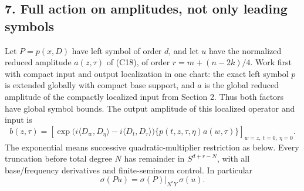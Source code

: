 \documentclass[
  11pt,
]{article}
\makeatletter
\let\ReaderOriginalAnchorStart\hyper@anchorstart
\let\ReaderOriginalAnchorEnd\hyper@anchorend
\let\ReaderPendingAliases\@empty
\def\ReaderArmAliases#1{\gdef\ReaderPendingAliases{#1}}
\def\hyper@anchorstart#1{\ReaderIfNativeAnchorTF{#1}{\ReaderPendingAliases\global\let\ReaderPendingAliases\@empty}{}\ReaderOriginalAnchorStart{#1}}
\makeatother
\begin{document}
\ReaderArmAliases{\ReaderOriginalAnchorStart{AN03-CN-007}\ReaderOriginalAnchorEnd\begingroup\expandafter\def\csname @currentHref\endcsname{AN03-CN-007}\label{AN03-CN-007}\endgroup\ReaderOriginalAnchorStart{an03-cn-007-full-action-on-amplitudes-not-only-leading-symbols}\ReaderOriginalAnchorEnd\begingroup\expandafter\def\csname @currentHref\endcsname{an03-cn-007-full-action-on-amplitudes-not-only-leading-symbols}\label{an03-cn-007-full-action-on-amplitudes-not-only-leading-symbols}\endgroup\ReaderOriginalAnchorStart{7-full-action-on-amplitudes-not-only-leading-symbols}\ReaderOriginalAnchorEnd\begingroup\expandafter\def\csname @currentHref\endcsname{7-full-action-on-amplitudes-not-only-leading-symbols}\label{7-full-action-on-amplitudes-not-only-leading-symbols}\endgroup\ReaderOriginalAnchorStart{full-action-on-amplitudes-not-only-leading-symbols}\ReaderOriginalAnchorEnd}
\subsection{7. Full action on amplitudes, not only leading
symbols}\label{full-action-on-amplitudes-not-only-leading-symbols}

Let \(P=p(x,D)\) have left symbol of order \(d\), and let \(u\) have the
normalized reduced amplitude \(a(z,\tau)\) of (C18), of order
\(r=m+(n-2k)/4\). Work first with compact input and output localization
in one chart: the exact left symbol \(p\) is extended globally with
compact base support, and \(a\) is the global reduced amplitude of the
compactly localized input from Section 2. Thus both factors have global
symbol bounds. The output amplitude of this localized operator and input
is \[
b(z,\tau)=
\left[
\exp\big(i\langle D_w,D_\eta\rangle-i\langle D_t,D_\tau\rangle\big)
\{p(t,z,\tau,\eta)a(w,\tau)\}
\right]_{w=z,\ t=0,\ \eta=0}.
\tag{C22}
\] The exponential means successive quadratic-multiplier restriction as
below. Every truncation before total degree \(N\) has remainder in
\(S^{d+r-N}\), with all base/frequency derivatives and finite-seminorm
control. In particular \[
\sigma(Pu)=\sigma(P)|_{N^*Y}\,\sigma(u).
\tag{C23}
\]
\end{document}
